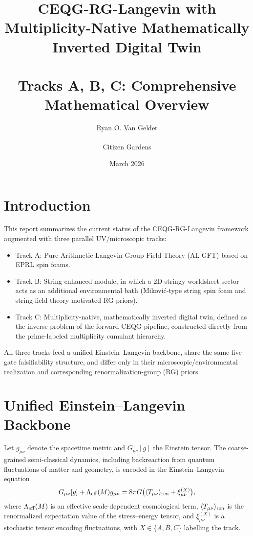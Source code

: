 \documentclass[11pt]{article}
\title{CEQG-RG-Langevin with Multiplicity-Native Mathematically Inverted Digital Twin\\\\Tracks A, B, C: Comprehensive Mathematical Overview}
\author{Ryan O. Van Gelder \\ \\ Citizen Gardens}
\date{March 2026}
\begin{document}
\maketitle

\section{Introduction}

This report summarizes the current status of the CEQG-RG-Langevin framework augmented with three parallel UV/microscopic tracks:

\begin{itemize}
  \item Track A: Pure Arithmetic-Langevin Group Field Theory (AL-GFT) based on EPRL spin foams.
  \item Track B: String-enhanced module, in which a 2D stringy worldsheet sector acts as an additional environmental bath (Mikovi\'c-type string spin foam and string-field-theory motivated RG priors).
  \item Track C: Multiplicity-native, mathematically inverted digital twin, defined as the inverse problem of the forward CEQG pipeline, constructed directly from the prime-labeled multiplicity cumulant hierarchy.
\end{itemize}

All three tracks feed a unified Einstein--Langevin backbone, share the same five-gate falsifiability structure, and differ only in their microscopic/environmental realization and corresponding renormalization-group (RG) priors.

\section{Unified Einstein--Langevin Backbone}

Let $g_{\mu\nu}$ denote the spacetime metric and $G_{\mu\nu}[g]$ the Einstein tensor. The coarse-grained semi-classical dynamics, including backreaction from quantum fluctuations of matter and geometry, is encoded in the Einstein--Langevin equation
\begin{equation}
  G_{\mu\nu}[g] + \Lambda_{\rm eff}(M) g_{\mu\nu}
  = 8\pi G \big( \langle T_{\mu\nu} \rangle_{\rm ren} + \xi^{(X)}_{\mu\nu} \big),
  \label{eq:einstein-langevin}
\end{equation}
where $\Lambda_{\rm eff}(M)$ is an effective scale-dependent cosmological term, $\langle T_{\mu\nu} \rangle_{\rm ren}$ is the renormalized expectation value of the stress--energy tensor, and $\xi^{(X)}_{\mu\nu}$ is a stochastic tensor encoding fluctuations, with $X \in \{A,B,C\}$ labelling the track.
\end{document}
